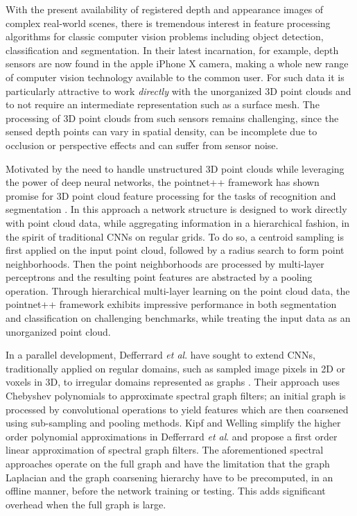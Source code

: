 \documentclass[runningheads]{llncs}
\newcommand{\etal}{\textit{et al}. }
\begin{document}
With the present availability of registered depth and appearance images of complex real-world scenes, there is tremendous interest in feature processing algorithms for classic computer vision problems including object detection, classification and segmentation. In their latest incarnation, for example, depth sensors are now found in the apple iPhone X camera, making a whole new range of computer vision technology available to the common user. For such data it is particularly attractive to work {\em directly} with the unorganized 3D point clouds and to not require an intermediate representation such as a surface mesh. The processing of 3D point clouds from such sensors remains challenging, since the sensed depth points can vary in spatial density, can be incomplete due to occlusion or perspective effects and can suffer from sensor noise. 

Motivated by the need to handle unstructured 3D point clouds while leveraging the power of deep neural networks, the pointnet++ framework has shown promise for 3D point cloud feature processing for the tasks of recognition and segmentation \cite{qi2017pointnet}. In this approach a network structure is designed to work directly with point cloud data, while aggregating information in a hierarchical fashion, in the spirit of traditional CNNs on regular grids. To do so, a centroid sampling is first applied on the input point cloud, followed by a radius search to form point neighborhoods. Then the point neighborhoods are processed by multi-layer perceptrons \cite{qi2016pointnet} and the resulting point features are abstracted by a pooling operation. Through hierarchical multi-layer learning on the point cloud data, the pointnet++ framework exhibits impressive performance in both segmentation and classification on challenging benchmarks, while treating the input data as an unorganized point cloud.


In a parallel development, Defferrard \etal have sought to extend CNNs, traditionally applied on regular domains, such as
sampled image pixels in 2D or voxels in 3D, to irregular domains represented as graphs \cite{defferrard2016convolutional}. Their approach uses Chebyshev polynomials to approximate spectral graph filters; an initial graph is processed by convolutional operations to yield features which are then coarsened using sub-sampling and pooling methods. Kipf and Welling \cite{kipf2016semi} simplify the higher order polynomial approximations in Defferrard \etal and propose a first order linear approximation of spectral graph filters. The aforementioned spectral approaches operate on the full graph and have the limitation that the graph Laplacian and the graph coarsening hierarchy have to be precomputed, in an offline manner, before the network training or testing. This adds significant overhead when the full graph is large. 
\end{document}
